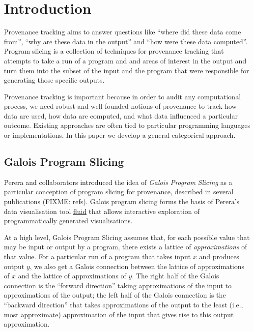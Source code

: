 \section{Introduction}

Provenance tracking aims to answer questions like ``where did these data come from'', ``why are these data in the output'' and ``how were these data computed''. Program slicing is a collection of techniques for provenance tracking that attempts to take a run of a program and and areas of interest in the output and turn them into the subset of the input and the program that were responsible for generating those specific outputs.

Provenance tracking is important because in order to audit any computational process, we need robust and well-founded notions of provenance to track how data are used, how data are computed, and what data influenced a particular outcome. Existing approaches are often tied to particular programming languages or implementations. In this paper we develop a general categorical approach.


\subsection{Galois Program Slicing}

Perera and collaborators introduced the idea of {\em Galois Program Slicing} as a particular conception of program slicing for provenance, described in several publications (FIXME: refs). Galois program slicing forms the basis of Perera's data visualisation tool \href{https://f.luid.org/}{fluid} that allows interactive exploration of programmatically generated visualisations.

At a high level, Galois Program Slicing assumes that, for each possible value that may be input or output by a program, there exists a lattice of {\em approximations} of that value. For a particular run of a program that takes input $x$ and produces output $y$, we also get a Galois connection between the lattice of approximations of $x$ and the lattice of approximations of $y$. The right half of the Galois connection is the ``forward direction'' taking approximations of the input to approximations of the output; the left half of the Galois connection is the ``backward direction'' that takes approximations of the output to the least (i.e., most approximate) approximation of the input that gives rise to this output approximation.

